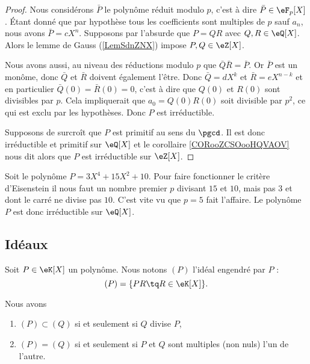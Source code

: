 \begin{proof}
    Nous considérons \( \bar P\) le polynôme réduit modulo \( p\), c'est à dire \( \bar P\in \eF_p[X]\). Étant donné que par hypothèse tous les coefficients sont multiples de \( p\) sauf \( a_n\), nous avons \( \bar P=cX^n\). Supposons par l'absurde que \( P=QR\) avec \( Q,R\in \eQ[X]\). Alors le lemme de Gauss (\ref{LemSdnZNX}) impose \( P,Q\in \eZ[X]\).

    Nous avons aussi, au niveau des réductions modulo \( p\) que $\bar Q\bar R=\bar P$. Or \( \bar P\) est un monôme, donc \( \bar Q\) et \( \bar R\) doivent également l'être. Donc \( \bar Q=dX^k\) et \( \bar R=eX^{n-k}\) et en particulier \( \bar Q(0)=\bar R(0)=0\), c'est à dire que \( Q(0)\) et \( R(0)\) sont divisibles par \( p\). Cela impliquerait que \( a_0=Q(0)R(0)\) soit divisible par \( p^2\), ce qui est exclu par les hypothèses. Donc \( P\) est irréductible.

    Supposons de surcroît que \( P\) est primitif au sens du \( \pgcd\). Il est donc irréductible et primitif sur \( \eQ[X]\) et le corollaire \ref{CORooZCSOooHQVAOV} nous dit alors que \( P\) est irréductible sur \( \eZ[X]\).
\end{proof}

\begin{example}
    Soit le polynôme \( P=3X^4+15 X^2+10\). Pour faire fonctionner le critère d'Eisenstein il nous faut un nombre premier \( p\) divisant \( 15\) et \( 10\), mais pas \( 3\) et dont le carré ne divise pas \( 10\). C'est vite vu que \( p=5\) fait l'affaire. Le polynôme \( P\) est donc irréductible sur \( \eQ[X]\).
\end{example}

\subsection{Idéaux}

Soit \( P\in \eK[X]\) un polynôme. Nous notons \( (P)\) l'idéal engendré par \( P\) :
\begin{equation}        \label{EqDefxMkDtW}
    (P)=\{ PR\tq R\in\eK[X] \}.
\end{equation}

\begin{lemma}
    Nous avons
    \begin{enumerate}
        \item
            \( (P)\subset (Q)\) si et seulement si \( Q\) divise \( P\),
        \item
            \( (P)=(Q)\) si et seulement si \( P\) et \( Q\) sont multiples (non nuls) l'un de l'autre.
    \end{enumerate}
\end{lemma}

